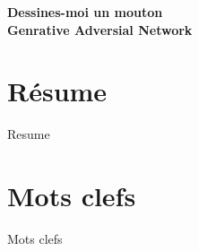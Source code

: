
\newpage

{
\setlength{\baselineskip}{14pt}
\setlength{\parindent}{0pt}
\setlength{\parskip}{8pt}

\begin{center}

\noindent \textbf{\huge
Dessines-moi un mouton\\[8pt]
Genrative Adversial Network
}


\end{center}

\section*{Résume}


Resume


\section*{Mots clefs}


Mots clefs

}

\newpage %
